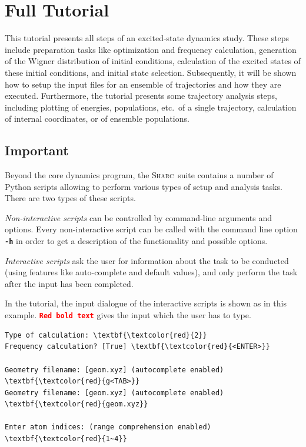 \documentclass[a4paper,11pt,DIV=15,openany]{scrbook}
\newcommand{\sharc}{\textsc{Sharc}}
\newcommand{\ttt}[1]{\textbf{\texttt{#1}}}
\begin{document}

\chapter{Full Tutorial}\label{chap:full}

This tutorial presents all steps of an excited-state dynamics study. 
These steps include preparation tasks like optimization and frequency calculation, generation of the Wigner distribution of initial conditions, calculation of the excited states of these initial conditions, and initial state selection. 
Subsequently, it will be shown how to setup the input files for an ensemble of trajectories and how they are executed.
Furthermore, the tutorial presents some trajectory analysis steps, including plotting of energies, populations, etc.\ of a single trajectory, calculation of internal coordinates, or of ensemble populations.


\section{Important}

Beyond the core dynamics program, the \sharc\ suite contains a number of Python scripts allowing to perform various types of setup and analysis tasks. 
There are two types of these scripts.

\emph{Non-interactive scripts} can be controlled by command-line arguments and options. 
Every non-interactive script can be called with the command line option \ttt{-h} in order to get a description of the functionality and possible options.

\emph{Interactive scripts} ask the user for information about the task to be conducted (using features like auto-complete and default values), and only perform the task after the input has been completed. 

In the tutorial, the input dialogue of the interactive scripts is shown as in this example. 
\texttt{\textbf{\textcolor{red}{Red bold text}}} gives the input which the user has to type. 
\begin{oframed}
\footnotesize\begin{Verbatim}[commandchars=\\\{\}]
Type of calculation: \textbf{\textcolor{red}{2}}
Frequency calculation? [True] \textbf{\textcolor{red}{<ENTER>}}

Geometry filename: [geom.xyz] (autocomplete enabled) \textbf{\textcolor{red}{g<TAB>}}
Geometry filename: [geom.xyz] (autocomplete enabled) \textbf{\textcolor{red}{geom.xyz}}

Enter atom indices: (range comprehension enabled) \textbf{\textcolor{red}{1~4}}
\end{Verbatim}
\end{oframed}
\end{document}
